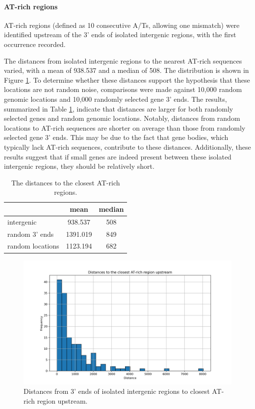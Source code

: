 \paragraph{AT-rich regions}

AT-rich regions (defined as 10 consecutive A/Ts, allowing one mismatch) were identified upstream of the 3' ends of isolated intergenic regions,
with the first occurrence recorded.

The distances from isolated intergenic regions to the nearest AT-rich sequences varied, with a mean of 938.537 and a median of 508.
The distribution is shown in Figure \ref{fig:distancesATrich}.
To determine whether these distances support the hypothesis that these locations are not random noise,
comparisons were made against 10,000 random genomic locations and 10,000 randomly selected gene 3' ends.
The results, summarized in Table \ref{tab:distancesATrich},
indicate that distances are larger for both randomly selected genes and random genomic locations.
Notably, distances from random locations to AT-rich sequences are shorter on average than those from randomly selected gene 3' ends.
This may be due to the fact that gene bodies, which typically lack AT-rich sequences, contribute to these distances.
Additionally, these results suggest that if small genes are indeed present between these isolated intergenic regions,
they should be relatively short.

\begin{table}[htbp]
  \centering
  \begin{tabular}{l|cc}
    \toprule
     & mean & median  \\
    \midrule
    intergenic & 938.537 & 508 \\
    random 3' ends & 1391.019 & 849 \\
    random locations & 1123.194 & 682 \\
    \bottomrule
  \end{tabular}
  \caption{The distances to the closest AT-rich regions.}
  \label{tab:distancesATrich}
\end{table}

\begin{figure}
  \centering
  \includegraphics[width=\linewidth]{images/histogramATrich.png}
  \caption{Distances from 3' ends of isolated intergenic regions to closest AT-rich region upstream.}
  \label{fig:distancesATrich}
\end{figure}

